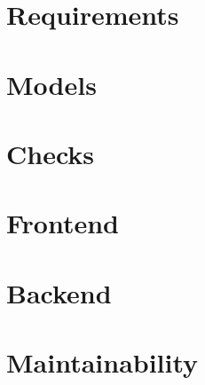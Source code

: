
\chapter{Requirements}


\chapter{Models}


\chapter{Checks}


\chapter{Frontend}


\chapter{Backend}


\chapter{Maintainability}


